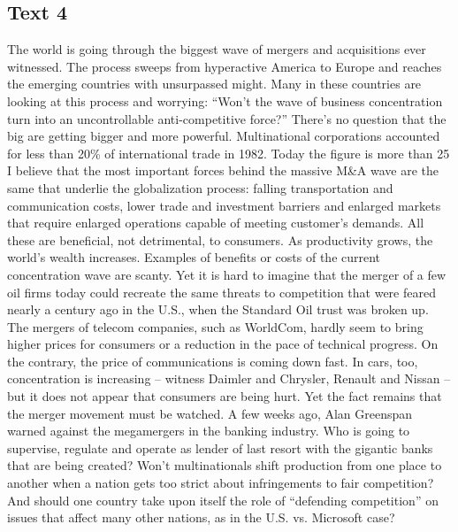\subsection{Text 4}
The world is going through the biggest wave of mergers and acquisitions ever witnessed. The process sweeps from hyperactive America to Europe and reaches the emerging countries with unsurpassed might. Many in these countries are looking at this process and worrying: “Won’t the wave of business concentration turn into an uncontrollable anti-competitive force?”
There’s no question that the big are getting bigger and more powerful. Multinational corporations accounted for less than 20\% of international trade in 1982. Today the figure is more than 25%
I believe that the most important forces behind the massive M\&A wave are the same that underlie the globalization process: falling transportation and communication costs, lower trade and investment barriers and enlarged markets that require enlarged operations capable of meeting customer’s demands. All these are beneficial, not detrimental, to consumers. As productivity grows, the world’s wealth increases.
Examples of benefits or costs of the current concentration wave are scanty. Yet it is hard to imagine that the merger of a few oil firms today could recreate the same threats to competition that were feared nearly a century ago in the U.S., when the Standard Oil trust was broken up. The mergers of telecom companies, such as WorldCom, hardly seem to bring higher prices for consumers or a reduction in the pace of technical progress. On the contrary, the price of communications is coming down fast. In cars, too, concentration is increasing -- witness Daimler and Chrysler, Renault and Nissan -- but it does not appear that consumers are being hurt.
Yet the fact remains that the merger movement must be watched. A few weeks ago, Alan Greenspan warned against the megamergers in the banking industry. Who is going to supervise, regulate and operate as lender of last resort with the gigantic banks that are being created? Won’t multinationals shift production from one place to another when a nation gets too strict about infringements to fair competition? And should one country take upon itself the role of “defending competition” on issues that affect many other nations, as in the U.S. vs. Microsoft case?

